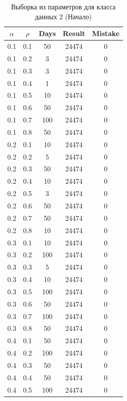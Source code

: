 \begin{center}
	\captionsetup{justification=raggedright,singlelinecheck=off}
	\begin{longtable}[c]{|c|c|c|c|c|}
		\caption{Выборка из параметров для класса данных 2 (Начало)\label{tbl:table_kd2-1}}\\ \hline
		$\alpha$ & $\rho$ & Days & Result & Mistake \\ \hline
		0.1 & 0.1 &  50 &   24474 &    0 \\
		0.1 & 0.2 &  3 &   24474 &    0 \\
		0.1 & 0.3 &  3 &   24474 &    0 \\
		0.1 & 0.4 &  1 &   24474 &    0 \\
		0.1 & 0.5 &  10 &   24474 &    0 \\
		0.1 & 0.6 &  50 &   24474 &    0 \\
		0.1 & 0.7 &  100 &   24474 &    0 \\
		0.1 & 0.8 &  50 &    24474 &    0 \\ \hline
		0.2 & 0.1 &  10 &   24474 &    0 \\
		0.2 & 0.2 &  5 &   24474 &    0 \\
		0.2 & 0.3 &  50 &   24474 &    0 \\
		0.2 & 0.4 &  10 &   24474 &    0 \\
		0.2 & 0.5 &  3 &   24474 &    0 \\
		0.2 & 0.6 &  50 &   24474 &    0 \\
		0.2 & 0.7 &  50 &   24474 &    0 \\
		0.2 & 0.8 &  10 &  24474 &    0 \\ \hline
		0.3 & 0.1 &  10 &   24474 &    0 \\
		0.3 & 0.2 &  100 &   24474 &    0 \\
		0.3 & 0.3 &  5 &   24474 &    0 \\
		0.3 & 0.4 &  10 &   24474 &    0 \\
		0.3 & 0.5 &  100 &   24474 &    0 \\
		0.3 & 0.6 &  50 &   24474 &    0 \\
		0.3 & 0.7 &  100 &   24474 &    0 \\
		0.3 & 0.8 &  50 &  24474 &    0 \\ \hline
		0.4 & 0.1 &  50 &   24474 &    0 \\
		0.4 & 0.2 &  100 &   24474 &    0 \\
		0.4 & 0.3 &  50 &   24474 &    0 \\
		0.4 & 0.4 &  50 &   24474 &    0 \\
		0.4 & 0.5 &  100 &   24474 &    0 \\ \hline
	\end{longtable}
\end{center}

